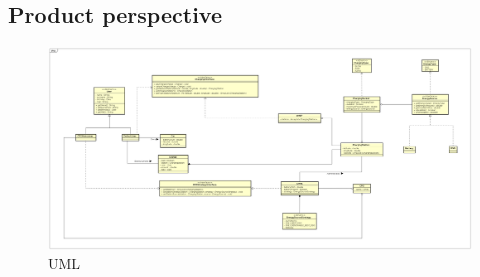 \subsection{Product perspective}
\begin{figure}[h!]
      \begin{center}
            \includegraphics[keepaspectratio, width=16cm]{UML.png}
            \caption{UML}
      \end{center}
\end{figure}

